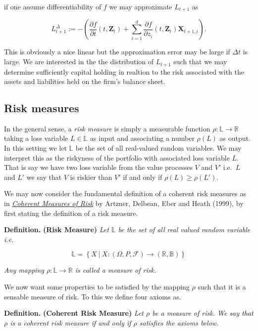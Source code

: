 \documentclass[a4paper,10pt,openany]{book}
\begin{document}
if one assume differentiability of \(f\) we may approximate \(L_{t+1}\) as

\[
L_{t+1}^\Delta:=-\left(\frac{\partial f}{\partial t}(t,\mathbf{Z}_t)+\sum_{i=1}^d \frac{\partial f}{\partial z_i}(t,\mathbf{Z}_t)\mathbf{X}_{t+1,i}\right).\tag{2.4}
\]

This is obviously a nice linear but the approximation error may be large if \(\Delta t\) is large. We are interested in the the distribution of \(L_{t+1}\) such that we may determine sufficiently capital holding in realtion to the risk associated with the assets and liabilities held on the firm's balance sheet.

\hypertarget{risk-measures}{%
\subsection{Risk measures}\label{risk-measures}}

In the general sense, a \emph{risk measure} is simply a measurable function \(\rho : \mathbb{L} \to\mathbb{R}\) taking a loss variable \(L\in \mathbb{L}\) as input and associating a number \(\rho(L)\) as output. In this setting we let \(\mathbb{L}\) be the set of all real-valued random variables. We may interpret this as the riskyness of the portfolio with associated loss variable \(L\). That is say we have two loss variable from the value processes \(V\) and \(V'\) i.e.~\(L\) and \(L'\) we say that \(V\) is riskier than \(V'\) if and only if \(\rho(L)\ge \rho(L')\).

We may now consider the fundamental definition of a coherent risk measures as in \href{https://www.researchgate.net/publication/227614132_Coherent_Measures_of_Risk}{\emph{Coherent Measures of Risk}} by Artzner, Delbean, Eber and Heath (1999), by first stating the definition of a risk measure.

\textbf{Definition.} \textbf{(Risk Measure)} \emph{Let \(\mathbb{L}\) be the set of all real valued random variable i.e.}

\[
\mathbb{L}=\left\{X\ \vert \ X : (\Omega,P,\mathcal{F})\to (\mathbb{R},\mathbb{B})\right\}
\]

\emph{Any mapping \(\rho : \mathbb{L} \to\mathbb{R}\) is called a measure of risk.}

We now want some properties to be satisfied by the mapping \(\rho\) such that it is a sensable measure of risk. To this we define four axioms as.

\textbf{Definition.} \textbf{(Coherent Risk Measure)} \emph{Let \(\rho\) be a measure of risk. We say that \(\rho\) is a coherent risk measure if and only if \(\rho\) satisfies the axioms below.}
\end{document}
